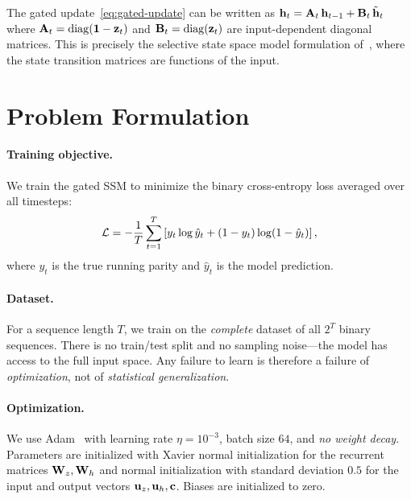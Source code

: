 \documentclass[11pt]{article}
\newcommand\hh{\mathbf{h}}
\begin{document}
\begin{remark}
The gated update~\eqref{eq:gated-update} can be written as
$\hh_t = \AA_t\, \hh_{t-1} + \BB_t\, \tilde{\hh}_t$
where $\mathbf{A}_t = \operatorname{diag}(\mathbf{1} - \mathbf{z}_t)$ and $\mathbf{B}_t = \operatorname{diag}(\mathbf{z}_t)$ are input-dependent diagonal matrices. This is precisely the selective state space model formulation of~\citet{gu2023mamba}, where the state transition matrices are functions of the input.
\end{remark}

\section{Problem Formulation}
\label{sec:problem}

\paragraph{Training objective.}
We train the gated SSM to minimize the binary cross-entropy loss averaged over all timesteps:
\begin{equation}
    \label{eq:loss}
    \mathcal{L} = -\frac{1}{T} \sum_{t=1}^{T} \left[y_t \log \hat{y}_t + (1 - y_t) \log(1 - \hat{y}_t)\right],
\end{equation}
where $y_t$ is the true running parity and $\hat{y}_t$ is the model prediction.

\paragraph{Dataset.}
For a sequence length $T$, we train on the \emph{complete} dataset of all $2^T$ binary sequences.
There is no train/test split and no sampling noise---the model has access to the full input space.
Any failure to learn is therefore a failure of \emph{optimization}, not of \emph{statistical generalization}.

\paragraph{Optimization.}
We use Adam~\citep{kingma2015adam} with learning rate $\eta = 10^{-3}$, batch size $64$, and \emph{no weight decay}.
Parameters are initialized with Xavier normal initialization for the recurrent matrices $\mathbf{W}_z, \mathbf{W}_h$ and normal initialization with standard deviation $0.5$ for the input and output vectors $\mathbf{u}_z, \mathbf{u}_h, \mathbf{c}$.
Biases are initialized to zero.
\end{document}
